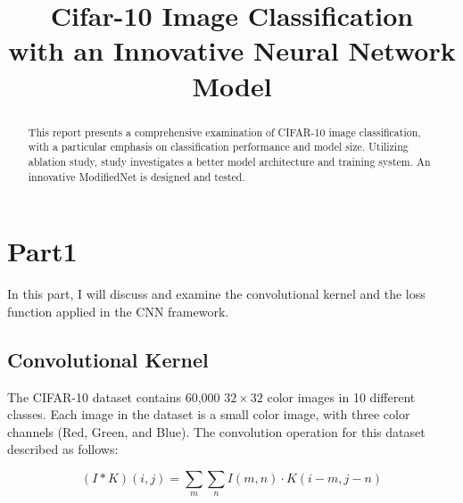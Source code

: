 \documentclass[conference]{IEEEtran}
\begin{document}
	
	\title{Cifar-10 Image Classification \\with an Innovative Neural Network Model}
	
	\author{
	}
	\maketitle
	
	\thispagestyle{fancy}
	\fancyhead[RO,R]{\today}
	\fancyfoot[LO,L]{}
	\fancyfoot[CO,C]{\thepage}
	\fancyfoot[RO,R]{}
	\renewcommand{\headrulewidth}{0.4pt}
	\renewcommand{\footrulewidth}{0.4pt}
	
	\begin{abstract}
		This report presents a comprehensive examination of CIFAR-10 image classification, with a particular emphasis on classification performance and model size. Utilizing ablation study, study investigates a better model architecture and training system. An innovative ModifiedNet is designed and tested.
	\end{abstract}
	
	\section{Part1}
	In this part, I will discuss and examine the convolutional kernel and the loss function applied in the CNN framework.
	
	\subsection{Convolutional Kernel}
	The CIFAR-10 dataset contains 60,000 \(32 \times 32\) color images in 10 different classes. Each image in the dataset is a small color image, with three color channels (Red, Green, and Blue). The convolution operation for this dataset described as follows:
	
	\begin{equation}
		(I * K)(i,j) = \sum_{m} \sum_{n} I(m,n) \cdot K(i-m, j-n)
	\end{equation}
	
\end{document}
